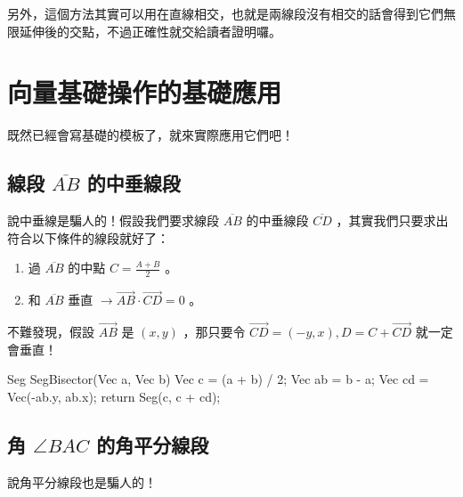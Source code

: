 \documentclass[main.tex]{subfiles}
\begin{document}
另外，這個方法其實可以用在直線相交，也就是兩線段沒有相交的話會得到它們無限延伸後的交點，不過正確性就交給讀者證明囉。

\section{向量基礎操作的基礎應用}

既然已經會寫基礎的模板了，就來實際應用它們吧！

\subsection{線段 $\overline{AB}$ 的中垂線段}

說中垂線是騙人的！假設我們要求線段 $\overline{AB}$ 的中垂線段 $\overline{CD}$ ，其實我們只要求出符合以下條件的線段就好了：

\begin{enumerate}
	\item 過 $\overline{AB}$ 的中點 $C = \frac{A + B}{2}$ 。
	\item 和 $\overline{AB}$ 垂直 $\rightarrow \vec{AB} \cdot \vec{CD} = 0$ 。
\end{enumerate}

不難發現，假設 $\vec{AB}$ 是 $(x, y)$ ，那只要令 $\vec{CD} = (-y, x), D = C + \vec{CD}$ 就一定會垂直！

\begin{C++}
Seg SegBisector(Vec a, Vec b) {
	Vec c = (a + b) / 2;
	Vec ab = b - a;
	Vec cd = Vec(-ab.y, ab.x);
	return Seg(c, c + cd);
}
\end{C++}

\subsection{角 $\angle BAC$ 的角平分線段}

說角平分線段也是騙人的！
\end{document}
